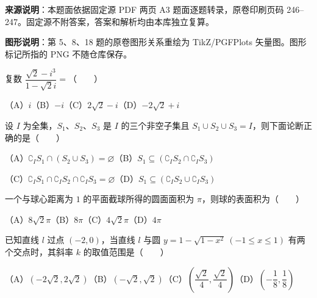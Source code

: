 


\begin{gktip}
\textbf{来源说明}：本题面依据固定源 PDF 两页 A3 题面逐题转录，原卷印刷页码 246–247。固定源不附答案，答案和解析均由本库独立复算。

\textbf{图形说明}：第 5、8、18 题的原卷图形关系重绘为 TikZ/PGFPlots 矢量图。图形标记所指的 PNG 不随仓库保存。
\end{gktip}


\begin{question}
复数 $\dfrac{\sqrt2-i^3}{1-\sqrt2i}=$\mbox{（　　）}

（A）$i$\quad（B）$-i$\quad（C）$2\sqrt2-i$\quad（D）$-2\sqrt2+i$

\end{question}
\begin{question}
设 $I$ 为全集，$S_1\text{、}S_2\text{、}S_3$ 是 $I$ 的三个非空子集且 $S_1\cup S_2\cup S_3=I$，则下面论断正确的是\mbox{（　　）}

（A）$\complement_I S_1\cap(S_2\cup S_3)=\varnothing$\quad（B）$S_1\subseteq(\complement_I S_2\cap\complement_I S_3)$

（C）$\complement_I S_1\cap\complement_I S_2\cap\complement_I S_3=\varnothing$\quad（D）$S_1\subseteq(\complement_I S_2\cup\complement_I S_3)$

\end{question}
\begin{question}
一个与球心距离为 $1$ 的平面截球所得的圆面面积为 $\pi$，则球的表面积为\mbox{（　　）}

（A）$8\sqrt2\pi$\quad（B）$8\pi$\quad（C）$4\sqrt2\pi$\quad（D）$4\pi$

\end{question}
\begin{question}
已知直线 $l$ 过点 $(-2,0)$，当直线 $l$ 与圆 $y=1-\sqrt{1-x^2}\ (-1\leqslant x\leqslant1)$ 有两个交点时，其斜率 $k$ 的取值范围是\mbox{（　　）}

（A）$(-2\sqrt2,2\sqrt2)$\quad（B）$(-\sqrt2,\sqrt2)$\quad（C）$\left(\dfrac{\sqrt2}{4},\dfrac{\sqrt2}{4}\right)$\quad（D）$\left(-\dfrac18,\dfrac18\right)$

\Needspace{0.4\textheight}
\end{question}
